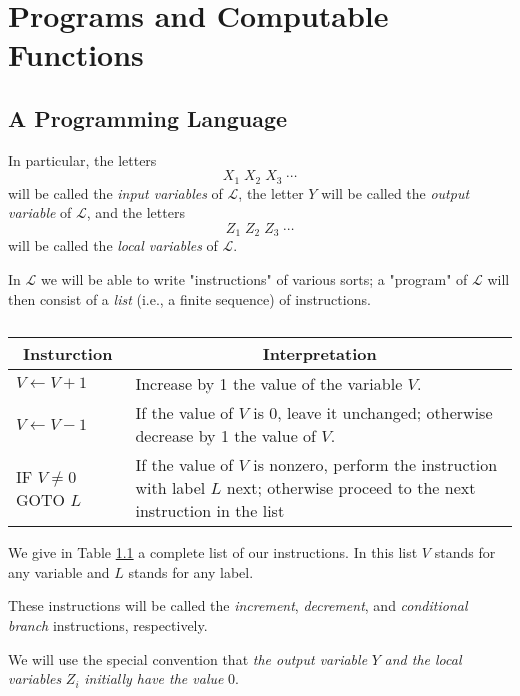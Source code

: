 \documentclass[a4paper,10pt,twoside]{book}
\begin{document}
\chapter{Programs and Computable Functions}
\section{A Programming Language}

In particular, the letters $$X_1\;X_2\;X_3\;\cdots$$ will be called the \textit{input variables} of $\mathscr{L}$, the letter $Y$ will be called the \textit{output variable} of $\mathscr{L}$, and the letters $$Z_1\;Z_2\;Z_3\;\cdots$$ will be called the \textit{local variables} of $\mathscr{L}$.

In $\mathscr{L}$ we will be able to write "instructions" of various sorts; a "program" of $\mathscr{L}$ will then consist of a \textit{list} (i.e., a finite sequence) of instructions.

\begin{table}[htbp]
    \caption{}
    \begin{tabular}{p{}p{}}
        \toprule
        \multicolumn{1}{c}{Insturction} & \multicolumn{1}{c}{Interpretation}                                                                                       \\
        \midrule
        $V\leftarrow V+1$     & Increase by 1 the value of the variable $V$.                                                                                       \\
        $V\leftarrow V-1$     & If the value of $V$ is 0, leave it unchanged; otherwise decrease by 1 the value of $V$.                                            \\
        IF $V\neq 0$ GOTO $L$ & If the value of $V$ is nonzero, perform the instruction with label $L$ next; otherwise proceed to the next instruction in the list \\
        \bottomrule
    \end{tabular}
    \label{table:1.1}
\end{table}

We give in Table \ref{table:1.1} a complete list of our instructions. In this list $V$ stands for any variable and $L$ stands for any label.

These instructions will be called the \textit{increment}, \textit{decrement}, and \textit{conditional branch} instructions, respectively.

We will use the special convention that \textit{the output variable} $Y$ \textit{and the local variables} $Z_i$ \textit{initially have the value} 0.
\end{document}
